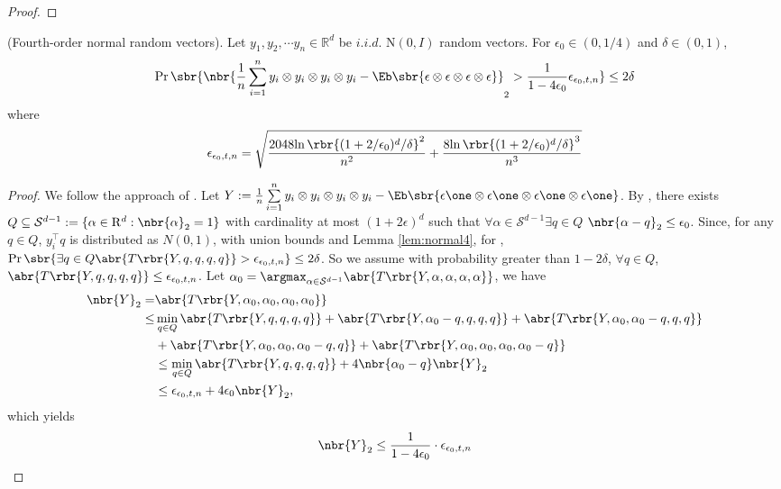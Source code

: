 \documentclass[twoside,11pt]{article}
\begin{document}
{\begin{proof}
\end{proof}
\vspace{-10mm}
\begin{lemma}{(Fourth-order normal random vectors).} 
  \label{lem:random4}
  Let $y_1,y_2, \cdots y_n \in \mathbb{R}^d$ be $i.i.d.$ $\mathrm{N}(0,I)$ random vectors. For $\epsilon_0 \in (0,1/4)$ and $\delta \in (0,1)$,
  \begin{align}
    \Pr \sbr{ \nbr{\frac{1}{n} \sum \limits_{i=1}^n y_i \otimes y_i \otimes y_i \otimes y_i -  \Eb \sbr{\epsilon  \otimes \epsilon  \otimes \epsilon  \otimes \epsilon } }_2 > \frac{1}{1-4\epsilon_0}  \epsilon_{\epsilon_0,t,n}  } \leq 2\delta
  \end{align}  
where
  \begin{align}
    \epsilon_{\epsilon_0,t,n} = \sqrt{\frac{2048{\ln\rbr{(1+2/\epsilon_0)^d/\delta }}^2 }{n^2}  +\frac{8 {\ln\rbr{(1+2/\epsilon_0)^d/\delta }}^3 }{n^3} }
  \end{align}
\end{lemma}
\begin{proof}
  We follow the approach of \citep{HsuKakZha09}. Let $Y:=\frac{1}{n} \sum \limits_{i=1}^n y_i \otimes y_i \otimes y_i \otimes y_i -  \Eb \sbr{\epsilon \one \otimes \epsilon \one \otimes \epsilon \one \otimes \epsilon \one}  $. By \cite{Pisier89}, there exists $Q \subseteq \mathcal{S}^{d-1} := \{ \alpha \in \mathrm{R}^d : \nbr{\alpha}_2 = 1\}$ with cardinality at most $(1+2\epsilon)^d$ such that $\forall \alpha \in \mathcal{S}^{d-1} \exists q \in Q$ $\nbr{\alpha-q}_2 \leq \epsilon_0$. Since, for any $q \in Q$, $y_i^\top q$ is distributed as $N(0,1)$, with union bounds and Lemma \ref{lem:normal4}, for ,$\Pr \sbr{ {\exists q \in Q}  \abr{T\rbr{Y,q,q,q,q}  } > \epsilon_{\epsilon_0,t,n}  } \leq 2\delta$. So we assume with probability greater than $1 - 2\delta$, $\forall q \in Q$, $\abr{T\rbr{Y,q,q,q,q}  } \leq \epsilon_{\epsilon_0,t,n}$.
Let $\alpha_0 = \argmax_{\alpha \in \mathcal{S}^{d-1}} \abr{T\rbr{Y,\alpha,\alpha,\alpha,\alpha}}$, we have
  \begin{align}
    \nbr{Y}_2 =& \abr{T\rbr{Y, \alpha_0, \alpha_0, \alpha_0, \alpha_0}}\\
    \leq& \min_{q \in Q} \abr{T\rbr{Y, q,q,q,q}} + \abr{T\rbr{Y, \alpha_0 - q,q,q,q}} +\abr{T\rbr{Y, \alpha_0 , \alpha_0 - q,q,q}} \nonumber\\
    &+\abr{T\rbr{Y, \alpha_0 ,\alpha_0, \alpha_0 - q,q}}+\abr{T\rbr{Y, \alpha_0,\alpha_0,\alpha_0, \alpha_0 - q}} \\
    & \leq  \min_{q \in Q} \abr{T\rbr{Y, q,q,q,q}} + 4 \nbr{\alpha_0 -q} \nbr{Y}_2\\
    & \leq  \epsilon_{\epsilon_0,t,n} + 4 \epsilon_0 \nbr{Y}_2,
  \end{align}
which yields
  \begin{align}
    \nbr{Y}_2 \leq \frac{1}{1-4\epsilon_0} \cdot \epsilon_{\epsilon_0,t,n}
  \end{align}
\end{proof}

}
\end{document}
